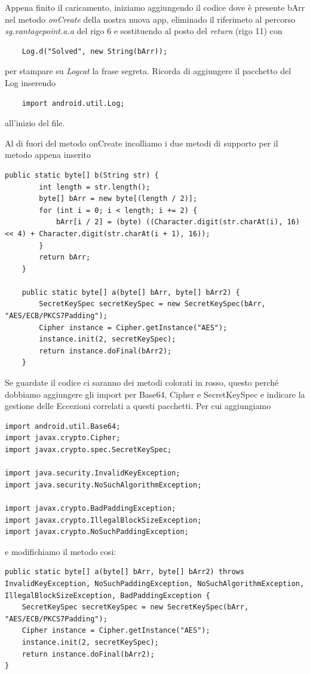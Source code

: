 \documentclass{article}
\begin{document}
Appena finito il caricamento, iniziamo aggiungendo il codice dove è presente bArr nel metodo \textit{onCreate} della nostra nuova app,
 eliminado il riferimeto al percorso \emph{sg.vantagepoint.a.a} del rigo 6 e sostituendo al posto del \textit{return} (rigo 11) con
\begin{verbatim}
    Log.d("Solved", new String(bArr));
\end{verbatim}
per stampare su \textit{Logcat} la frase segreta. Ricorda di aggiungere il pacchetto del Log inserendo 
\begin{verbatim}
    import android.util.Log;
\end{verbatim}
all'inizio del file.

Al di fuori del metodo onCreate incolliamo i due metodi di supporto per il metodo appena inserito
\begin{lstlisting}[style=JavaStyle]
    public static byte[] b(String str) {
        int length = str.length();
        byte[] bArr = new byte[(length / 2)];
        for (int i = 0; i < length; i += 2) {
            bArr[i / 2] = (byte) ((Character.digit(str.charAt(i), 16) << 4) + Character.digit(str.charAt(i + 1), 16));
        }
        return bArr;
    }

    public static byte[] a(byte[] bArr, byte[] bArr2) {
        SecretKeySpec secretKeySpec = new SecretKeySpec(bArr, "AES/ECB/PKCS7Padding");
        Cipher instance = Cipher.getInstance("AES");
        instance.init(2, secretKeySpec);
        return instance.doFinal(bArr2);
    }
\end{lstlisting}


Se guardate il codice ci saranno dei metodi colorati in rosso, questo perché dobbiamo aggiungere gli import per Base64, Cipher e SecretKeySpec e indicare la gestione 
delle Eccezioni correlati a questi pacchetti. Per cui aggiungiamo
\begin{lstlisting}[style=JavaStyle]
import android.util.Base64;
import javax.crypto.Cipher;
import javax.crypto.spec.SecretKeySpec;

import java.security.InvalidKeyException;
import java.security.NoSuchAlgorithmException;

import javax.crypto.BadPaddingException;
import javax.crypto.IllegalBlockSizeException;
import javax.crypto.NoSuchPaddingException;
\end{lstlisting}

e  modifichiamo il metodo cosi:

\begin{lstlisting}[style=JavaStyle]
public static byte[] a(byte[] bArr, byte[] bArr2) throws InvalidKeyException, NoSuchPaddingException, NoSuchAlgorithmException, IllegalBlockSizeException, BadPaddingException {
    SecretKeySpec secretKeySpec = new SecretKeySpec(bArr, "AES/ECB/PKCS7Padding");
    Cipher instance = Cipher.getInstance("AES");
    instance.init(2, secretKeySpec);
    return instance.doFinal(bArr2);
}
\end{lstlisting}
\end{document}
